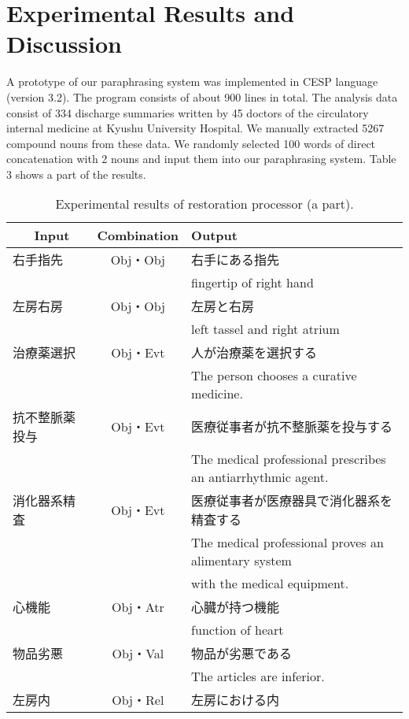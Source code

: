 \section{Experimental Results and Discussion}
A prototype of our paraphrasing system was implemented in CESP
language (version 3.2). The program consists of about 900 lines in
total. The analysis data consist of 334 discharge summaries written by
45 doctors of the circulatory internal medicine at Kyushu University
Hospital. We manually extracted 5267 compound nouns from these
data. We randomly selected 100 words of direct concatenation with 2
nouns and input them into our paraphrasing system. Table 3 shows a
part of the results.
\begin{table}
\begin{center}
\caption{Experimental results of restoration processor (a part).}
\begin{tabular}{l|c|l} \hline
 \ \ \ Input     & Combination & \hspace{3em} Output\\ \hline
 右手指先       & Obj・Obj  & 右手にある指先\\
                &           & fingertip of right hand\\
左房右房        & Obj・Obj  & 左房と右房\\
                &           & left tassel and right atrium\\
治療薬選択      & Obj・Evt  & 人が治療薬を選択する\\
                &           & The person chooses a curative medicine.\\
 抗不整脈薬投与 & Obj・Evt  & 医療従事者が抗不整脈薬を投与する\\
                &           & The medical professional prescribes
an antiarrhythmic agent.\\
消化器系精査   & Obj・Evt & 医療従事者が医療器具で消化器系を精査する\\
                &           & The medical professional proves an alimentary
 system\\
                &           & with the medical equipment.\\
 心機能         & Obj・Atr  & 心臓が持つ機能\\
                &           & function of heart\\
 物品劣悪       & Obj・Val  & 物品が劣悪である\\
                &           & The articles are inferior.\\
 左房内         & Obj・Rel  & 左房における内\\

\end{tabular}
\end{center}
\end{table}
